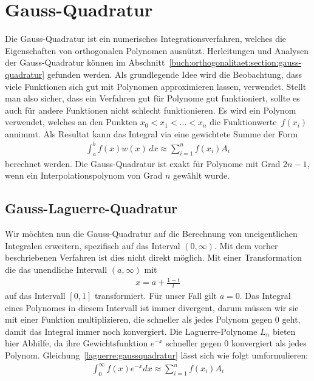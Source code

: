 %
%
%
\section{Gauss-Quadratur
  \label{laguerre:section:quadratur}}
Die Gauss-Quadratur ist ein numerisches Integrationsverfahren,
welches die Eigenschaften von orthogonalen Polynomen ausnützt.
Herleitungen und Analysen der Gauss-Quadratur können im 
Abschnitt~\ref{buch:orthogonalitaet:section:gauss-quadratur} gefunden werden.
Als grundlegende Idee wird die Beobachtung,
dass viele Funktionen sich gut mit Polynomen approximieren lassen,
verwendet.
Stellt man also sicher,
dass ein Verfahren gut für Polynome gut funktioniert, 
sollte es auch für andere Funktionen nicht schlecht funktionieren.
Es wird ein Polynom verwendet, 
welches an den Punkten $x_0 < x_1 < \ldots < x_n$ 
die Funktionwerte~$f(x_i)$ annimmt.
Als Resultat kann das Integral via eine gewichtete Summe der Form
\begin{align}
\int_a^b f(x) w(x) \, dx
\approx
\sum_{i=1}^n f(x_i) A_i
\label{laguerre:gaussquadratur}
\end{align}
berechnet werden.
Die Gauss-Quadratur ist exakt für Polynome mit Grad $2n -1$,
wenn ein Interpolationspolynom von Grad $n$ gewählt wurde.

\subsection{Gauss-Laguerre-Quadratur
\label{laguerre:subsection:gausslag-quadratur}}
Wir möchten nun die Gauss-Quadratur auf die Berechnung
von uneigentlichen Integralen erweitern,
spezifisch auf das Interval $(0, \infty)$.
Mit dem vorher beschriebenen Verfahren ist dies nicht direkt möglich.
Mit einer Transformation die das unendliche Intervall $(a, \infty)$ mit
\begin{align*}
x
=
a + \frac{1 - t}{t}
\end{align*}
auf das Intervall $[0, 1]$ transformiert.
Für unser Fall gilt $a = 0$.
Das Integral eines Polynomes in diesem Intervall ist immer divergent,
darum müssen wir sie mit einer Funktion multiplizieren,
die schneller als jedes Polynom gegen $0$ geht,
damit das Integral immer noch konvergiert.
Die Laguerre-Polynome $L_n$ bieten hier Abhilfe,
da ihre Gewichtsfunktion $e^{-x}$ schneller
gegen $0$ konvergiert als jedes Polynom.
Gleichung~\eqref{laguerre:gaussquadratur} lässt sich wie folgt
umformulieren:
\begin{align}
\int_{0}^{\infty} f(x) e^{-x} dx
\approx
\sum_{i=1}^{n} f(x_i) A_i
\label{laguerre:laguerrequadratur}
\end{align}

